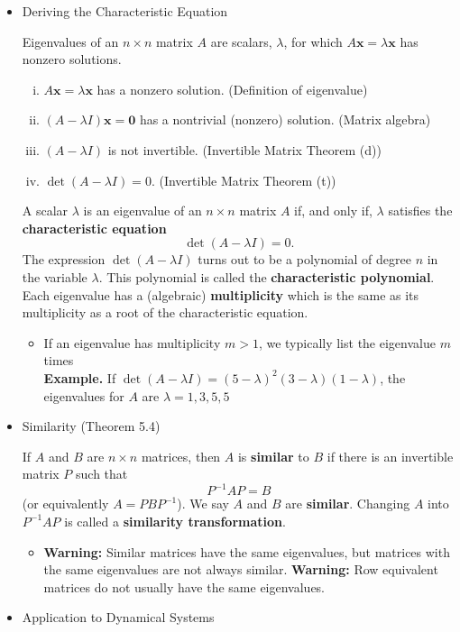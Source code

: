 \documentclass[10pt]{book}
\newenvironment{boxdef}{\begin{mdframed}[backgroundcolor=gray!30,linewidth=0pt,nobreak=true]}{\end{mdframed}}
\newcommand{\vect}[1]{\ensuremath{\boldsymbol{\mathbf{#1}}}}
\newcommand{\Axlx}{A\vect{x}=\lambda\vect{x}}
\begin{document}
\begin{itemize}
	\item Deriving the Characteristic Equation
	\begin{boxdef}
		Eigenvalues of an $n\times n$ matrix $A$ are scalars, $\lambda$, for which $\Axlx$ has nonzero solutions.
		\begin{enumerate}[(i)]
			\item $\Axlx$ has a nonzero solution.
				\hfill (Definition of eigenvalue)
			\item $(A-\lambda I)\vect{x} = \vect{0}$ has a nontrivial (nonzero) solution.
				\hfill (Matrix algebra)
			\item $(A - \lambda I)$ is not invertible.
				\hfill (Invertible Matrix Theorem (d))
			\item $\det(A-\lambda I) = 0$.
				\hfill (Invertible Matrix Theorem (t))
		\end{enumerate}
		A scalar $\lambda$ is an eigenvalue of an $n\times n$ matrix $A$ if, and only if, $\lambda$ satisfies the \textbf{characteristic equation}
		$$ \det(A-\lambda I) = 0. $$
		The expression $\det(A-\lambda I)$ turns out to be a polynomial of degree $n$ in the variable $\lambda$. This polynomial is called the \textbf{characteristic polynomial}. Each eigenvalue has a (algebraic) \textbf{multiplicity} which is the same as its multiplicity as a root of the characteristic equation.
		\end{boxdef}
	\begin{itemize}
		\item If an eigenvalue has multiplicity $m>1$, we typically list the eigenvalue $m$ times \\
		\textbf{Example.} If $\det(A-\lambda I)=(5-\lambda)^2(3-\lambda)(1-\lambda)$, the eigenvalues for $A$ are $\lambda=1,3,5,5$
	\end{itemize}
	\item Similarity (Theorem 5.4)
		\begin{boxdef}
			If $A$ and $B$ are $n\times n$ matrices, then $A$ is \textbf{similar} to $B$ if there is an invertible matrix $P$ such that $$P^{-1}AP=B$$ (or equivalently $A=PBP^{-1}$). We say $A$ and $B$ are \textbf{similar}. Changing $A$ into $P^{-1}AP$ is called a \textbf{similarity transformation}.
		\end{boxdef}
		\begin{itemize}
			\item \textbf{Warning:} Similar matrices have the same eigenvalues, but matrices with the same eigenvalues are not always similar.
			\textbf{Warning:} Row equivalent matrices do not usually have the same eigenvalues.
		\end{itemize}
	\item Application to Dynamical Systems
\end{itemize}
\end{document}
